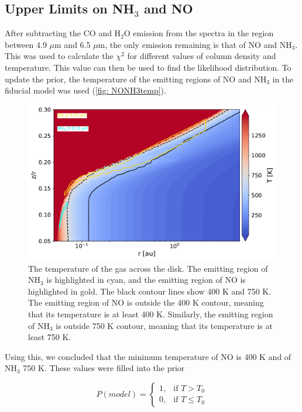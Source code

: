 \documentclass[oneside, single, authoryear, semicolon, 12pt]{lion-msc}
\newcommand{\4}{$_4$}
\newcommand{\3}{$_3$}
\newcommand{\2}{$_2$}
\begin{document}
\subsection{Upper Limits on NH\3 and NO}
After subtracting the CO and H\2O emission from the spectra in the region between 4.9 $\mu$m and 6.5 $\mu$m, the only emission remaining is that of NO and NH\3. This was used to calculate the $\chi^2$ for different values of column density and temperature. This value can then be used to find the likelihood distribution. To update the prior, the temperature of the emitting regions of NO and NH\3 in the fiducial model was used (\autoref{fig: NONH3temp}).

\begin{figure}[H]
    \centering
    \includegraphics[width=\linewidth]{Figures/NONH3temp.pdf}
    \caption{The temperature of the gas across the disk. The emitting region of NH\3 is highlighted in cyan, and the emitting region of NO is highlighted in gold. The black contour lines show 400 K and 750 K. The emitting region of NO is outside the 400 K contour, meaning that its temperature is at least 400 K. Similarly, the emitting region of NH\3 is outside 750 K contour, meaning that its temperature is at least 750 K. }
    \label{fig: NONH3temp}
\end{figure}

Using this, we concluded that the minimum temperature of NO is 400 K and of NH\3 750 K. These values were filled into the prior

\begin{equation}
    P(model) = 
    \begin{cases}
        1, & \text{if } T > T_0 \\
        0, & \text{if } T \leq T_0
    \end{cases}
\end{equation}
\end{document}
